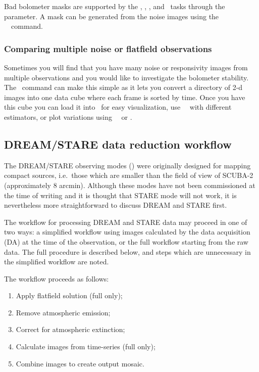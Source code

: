 \documentclass[oneside,11pt]{starlink}
\begin{document}
Bad bolometer masks are supported by the \flatfield, \extinction,
\remsky, and \makemap\ tasks through the 
parameter. A mask can be generated from the noise images using the
\KAPPA\ \thresh\ command.

\subsubsection{Comparing multiple noise or flatfield observations}

Sometimes you will find that you have many noise or responsivity
images from multiple observations and you would like to investigate the
bolometer stability. The \stackframes\ command can make this simple as
it lets you convert a directory of 2-d images into one data cube where
each frame is sorted by time. Once you have this cube you can load it
into \GAIA\ for easy visualization, use \KAPPA\ \collapse\ with
different estimators, or plot variations using \KAPPA\ \clinplot\ or \mlinplot.

\subsection{DREAM/STARE data reduction workflow\label{se:dsworkflow}}

The DREAM/STARE observing modes (\cite{scuba2}) were originally
designed for mapping compact sources, i.e.\ those which are smaller
than the field of view of SCUBA-2 (approximately 8 arcmin). Although
these modes have not been commissioned at the time of writing and it
is thought that STARE mode will not work, it is nevertheless more
straightforward to discuss DREAM and STARE first.

The workflow for processing DREAM and STARE data may proceed in one of
two ways: a simplified workflow using images calculated by the data
acquisition (DA) at the time of the observation, or the full workflow
starting from the raw data. The full procedure is described below, and
steps which are unnecessary in the simplified workflow are noted.

The workflow proceeds as follows:
\begin{enumerate}
\item Apply flatfield solution (full only);
\item Remove atmospheric emission;
\item Correct for atmospheric extinction;
\item Calculate images from time-series (full only);
\item Combine images to create output mosaic.
\end{enumerate}
\end{document}
